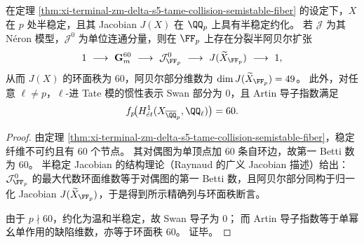 \begin{corollary}\label{cor:xi-terminal-zm-delta-s5-tame-collision-neron-conductor}
在定理 \ref{thm:xi-terminal-zm-delta-s5-tame-collision-semistable-fiber} 的设定下，\(X\) 在 \(p\) 处半稳定，且其 Jacobian \(J(X)\) 在 \(\QQ_p\) 上具有半稳定约化。
若 \(\mathcal J\) 为其 N\'eron 模型，\(\mathcal J^0\) 为单位连通分量，则在 \(\FF_p\) 上存在分裂半阿贝尔扩张
\[
1\ \longrightarrow\ \mathbf G_m^{60}\ \longrightarrow\ \mathcal J^0_{\FF_p}\ \longrightarrow\ J(\widetilde X_{\FF_p})\ \longrightarrow\ 1,
\]
从而 \(J(X)\) 的环面秩为 \(60\)，阿贝尔部分维数为 \(\dim J(\widetilde X_{\FF_p})=49\)。
此外，对任意 \(\ell\neq p\)，\(\ell\)-进 Tate 模的惯性表示 Swan 部分为 \(0\)，且 Artin 导子指数满足
\[
f_p\!\bigl(H^1_{\acute e t}(X_{\overline{\QQ}_p},\QQ_\ell)\bigr)=60.
\]
\end{corollary}
\begin{proof}
由定理 \ref{thm:xi-terminal-zm-delta-s5-tame-collision-semistable-fiber}，稳定纤维不可约且有 \(60\) 个节点。
其对偶图为单顶点加 \(60\) 条自环边，故第一 Betti 数为 \(60\)。
半稳定 Jacobian 的结构理论（Raynaud 的广义 Jacobian 描述）给出：\(\mathcal J^0_{\FF_p}\) 的最大代数环面维数等于对偶图的第一 Betti 数，且阿贝尔部分同构于归一化 Jacobian \(J(\widetilde X_{\FF_p})\)，于是得到所示精确列与环面秩断言。
\par
由于 \(p\nmid 60\)，约化为温和半稳定，故 Swan 导子为 \(0\)；
而 Artin 导子指数等于单幂幺单作用的缺陷维数，亦等于环面秩 \(60\)。
证毕。
\end{proof}

